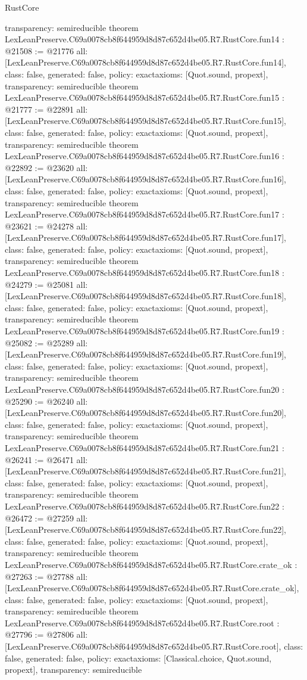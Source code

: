 \begin{lexlean}{RustCore}
\begin{coremodule}
{  transparency: semireducible
}
theorem LexLeanPreserve.C69a0078cb8f644959d8d87c652d4be05.R7.RustCore.fun14 : @21508 := @21776 {
  all: [LexLeanPreserve.C69a0078cb8f644959d8d87c652d4be05.R7.RustCore.fun14],
  class: false,
  generated: false,
  policy: exact{axioms: [Quot.sound, propext]},
  transparency: semireducible
}
theorem LexLeanPreserve.C69a0078cb8f644959d8d87c652d4be05.R7.RustCore.fun15 : @21777 := @22891 {
  all: [LexLeanPreserve.C69a0078cb8f644959d8d87c652d4be05.R7.RustCore.fun15],
  class: false,
  generated: false,
  policy: exact{axioms: [Quot.sound, propext]},
  transparency: semireducible
}
theorem LexLeanPreserve.C69a0078cb8f644959d8d87c652d4be05.R7.RustCore.fun16 : @22892 := @23620 {
  all: [LexLeanPreserve.C69a0078cb8f644959d8d87c652d4be05.R7.RustCore.fun16],
  class: false,
  generated: false,
  policy: exact{axioms: [Quot.sound, propext]},
  transparency: semireducible
}
theorem LexLeanPreserve.C69a0078cb8f644959d8d87c652d4be05.R7.RustCore.fun17 : @23621 := @24278 {
  all: [LexLeanPreserve.C69a0078cb8f644959d8d87c652d4be05.R7.RustCore.fun17],
  class: false,
  generated: false,
  policy: exact{axioms: [Quot.sound, propext]},
  transparency: semireducible
}
theorem LexLeanPreserve.C69a0078cb8f644959d8d87c652d4be05.R7.RustCore.fun18 : @24279 := @25081 {
  all: [LexLeanPreserve.C69a0078cb8f644959d8d87c652d4be05.R7.RustCore.fun18],
  class: false,
  generated: false,
  policy: exact{axioms: [Quot.sound, propext]},
  transparency: semireducible
}
theorem LexLeanPreserve.C69a0078cb8f644959d8d87c652d4be05.R7.RustCore.fun19 : @25082 := @25289 {
  all: [LexLeanPreserve.C69a0078cb8f644959d8d87c652d4be05.R7.RustCore.fun19],
  class: false,
  generated: false,
  policy: exact{axioms: [Quot.sound, propext]},
  transparency: semireducible
}
theorem LexLeanPreserve.C69a0078cb8f644959d8d87c652d4be05.R7.RustCore.fun20 : @25290 := @26240 {
  all: [LexLeanPreserve.C69a0078cb8f644959d8d87c652d4be05.R7.RustCore.fun20],
  class: false,
  generated: false,
  policy: exact{axioms: [Quot.sound, propext]},
  transparency: semireducible
}
theorem LexLeanPreserve.C69a0078cb8f644959d8d87c652d4be05.R7.RustCore.fun21 : @26241 := @26471 {
  all: [LexLeanPreserve.C69a0078cb8f644959d8d87c652d4be05.R7.RustCore.fun21],
  class: false,
  generated: false,
  policy: exact{axioms: [Quot.sound, propext]},
  transparency: semireducible
}
theorem LexLeanPreserve.C69a0078cb8f644959d8d87c652d4be05.R7.RustCore.fun22 : @26472 := @27259 {
  all: [LexLeanPreserve.C69a0078cb8f644959d8d87c652d4be05.R7.RustCore.fun22],
  class: false,
  generated: false,
  policy: exact{axioms: [Quot.sound, propext]},
  transparency: semireducible
}
theorem LexLeanPreserve.C69a0078cb8f644959d8d87c652d4be05.R7.RustCore.crate_ok : @27263 := @27788 {
  all: [LexLeanPreserve.C69a0078cb8f644959d8d87c652d4be05.R7.RustCore.crate_ok],
  class: false,
  generated: false,
  policy: exact{axioms: [Quot.sound, propext]},
  transparency: semireducible
}
theorem LexLeanPreserve.C69a0078cb8f644959d8d87c652d4be05.R7.RustCore.root : @27796 := @27806 {
  all: [LexLeanPreserve.C69a0078cb8f644959d8d87c652d4be05.R7.RustCore.root],
  class: false,
  generated: false,
  policy: exact{axioms: [Classical.choice, Quot.sound, propext]},
  transparency: semireducible
}


\end{coremodule}
\end{lexlean}
